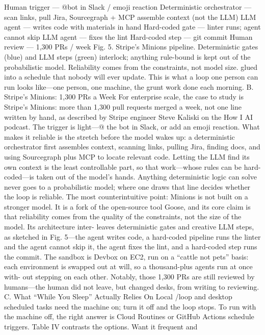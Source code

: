 \documentclass[conference]{IEEEtran}
\begin{document}

Human trigger — @bot in Slack / emoji reaction
Deterministic orchestrator — scan links, pull Jira,
Sourcegraph + MCP assemble context (not the LLM)
LLM agent — writes code with materials in hand
Hard-coded gate — linter runs; agent cannot skip
LLM agent — fixes the lint
Hard-coded step — git commit
Human review — 1,300 PRs / week
Fig. 5. Stripe’s Minions pipeline. Deterministic gates (blue) and LLM
steps (green) interlock; anything rule-bound is kept out of the
probabilistic model. Reliability comes from the constraints, not model
size.
glued into a schedule that nobody will ever update. This is what
a loop one person can run looks like—one person, one machine,
the grunt work done each morning.
B. Stripe’s Minions: 1,300 PRs a Week
For enterprise scale, the case to study is Stripe’s Minions:
more than 1,300 pull requests merged a week, not one line
written by hand, as described by Stripe engineer Steve Kaliski on
the How I AI podcast. The trigger is light—@ the bot in Slack,
or add an emoji reaction. What makes it reliable is the stretch
before the model wakes up: a deterministic orchestrator first
assembles context, scanning links, pulling Jira, finding docs, and
using Sourcegraph plus MCP to locate relevant code. Letting
the LLM find its own context is the least controllable part, so
that work—whose rules can be hard-coded—is taken out of the
model’s hands. Anything deterministic logic can solve never
goes to a probabilistic model; where one draws that line decides
whether the loop is reliable.
The most counterintuitive point: Minions is not built on a
stronger model. It is a fork of the open-source tool Goose, and
its core claim is that reliability comes from the quality of the
constraints, not the size of the model. Its architecture inter-
leaves deterministic gates and creative LLM steps, as sketched
in Fig. 5—the agent writes code, a hard-coded pipeline runs
the linter and the agent cannot skip it, the agent fixes the lint,
and a hard-coded step runs the commit. The sandbox is Devbox
on EC2, run on a “cattle not pets” basis: each environment is
swapped out at will, so a thousand-plus agents run at once with-
out stepping on each other. Notably, those 1,300 PRs are still
reviewed by humans—the human did not leave, but changed
desks, from writing to reviewing.
C. What “While You Sleep” Actually Relies On
Local /loop and desktop scheduled tasks need the machine
on; turn it off and the loop stops. To run with the machine off,
the right answer is Cloud Routines or GitHub Actions schedule
triggers. Table IV contrasts the options. Want it frequent and
\end{document}
